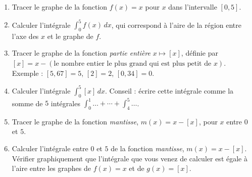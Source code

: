 \begin{exercice}\label{exoExamen-0001}
  \begin{enumerate}
  \item Tracer le graphe de la fonction $f(x)=x$ pour $x$ dans l'intervalle $[0,5]$.
    \item Calculer l'intégrale $\displaystyle \int_{0}^{5} f(x)\, dx$, qui correspond à l'aire de la région entre l'axe des $x$ et le graphe de $f$.
      \item Tracer le graphe de la fonction \emph{partie entière} $x\mapsto [x]$, définie par $[x]=x-(\textrm{le nombre entier le plus grand qui est plus petit de } x)$. Exemple : $[5,67]=5$, $[2]=2$, $[0,34]=0$.
        \item Calculer l'intégrale $\displaystyle \int_{0}^{5} [x]\, dx$. Conseil : écrire cette intégrale comme la somme de $5$ intégrales $\int_{0}^{1}\ldots+ \cdots +\int_{4}^{5}\ldots$. 
          \item Tracer le graphe de la fonction \emph{mantisse}, $m(x)=x-[x]$, pour $x$ entre $0$ et $5$.
          \item Calculer l'intégrale entre $0$ et $5$ de la fonction \emph{mantisse}, $m(x)=x-[x]$. Vérifier graphiquement que l'intégrale que vous venez de calculer est égale à l'aire entre les graphes de $f(x)=x$ et de $g(x)=[x]$.
        \begin{equation}
          
        \end{equation}
  \end{enumerate}
\end{exercice}

